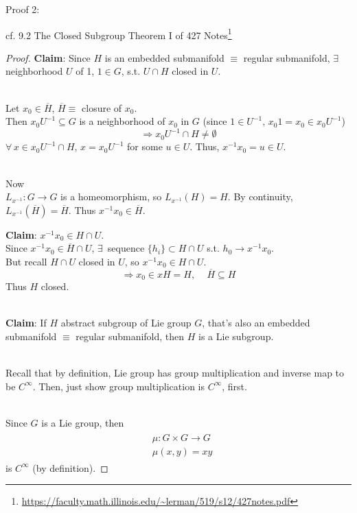 Proof 2:

cf. 9.2 The Closed Subgroup Theorem I of 427 Notes\footnote{\url{https://faculty.math.illinois.edu/~lerman/519/s12/427notes.pdf}}

\begin{proof}

	\textbf{Claim}: Since $H$ is an embedded submanifold $\equiv $ regular submanifold, $\exists \, $ neighborhood $U$ of 1, $1 \in G$, s.t. $U\cap H$ closed in $U$. 
	
	\qquad \, \\
	Let $x_0 \in \overline{H}$, $\overline{H} \equiv $ closure of $x_0$. \\
	Then $x_0U^{-1} \subseteq G$ is a neighborhood of $x_0$ in $G$ (since $1 \in U^{-1}$, $x_0 1 = x_0 \in x_0 U^{-1}$)
	\[
	\Longrightarrow x_0 U^{-1} \cap H \neq \emptyset 
	\]
	$\forall \, x \in x_0 U^{-1} \cap H$, $x= x_0 U^{-1}$ for some $u\in U$. Thus, $x^{-1} x_0 = u \in U$.
	
	\quad \\
	Now  \\
	$L_{x^{-1}} : G \to G$ is a homeomorphism, so $L_{x^{-1}}(H) = H$. By continuity, $L_{x^{-1}}(\overline{H}) = \overline{H}$. Thus $x^{-1}x_0 \in \overline{H}$. 
	
	\textbf{Claim}: $x^{-1} x_0 \in H \cap U$. \\
	Since $x^{-1}x_0 \in \overline{H} \cap U$, $\exists \, $ sequence $\lbrace h_i \rbrace \subset H \cap U$ s.t. $h_0 \to x^{-1} x_0$. \\
	But recall $H\cap U$ closed in $U$, so $x^{-1}x_0 \in H\cap U$. 
	\[
	\Longrightarrow x_0 \in xH = H , \quad \, \overline{H} \subseteq H
	\]
	Thus $H$ closed. 

	\quad \\ 	
	\textbf{Claim}: If $H$ abstract subgroup of Lie group $G$, that's also an embedded submanifold $\equiv$ regular submanifold, then $H$ is a Lie subgroup. 
	
	\quad \\ 
	Recall that by definition, Lie group has group multiplication and inverse map to be $C^{\infty}$. Then, just show group multiplication is $C^{\infty}$, first.

\quad \\	
Since $G$ is a Lie group, then
\[
\begin{gathered}
\begin{aligned}
& \mu : G \times G \to G \\
& \mu(x,y) = xy
\end{aligned}
\end{gathered}
\]	
is $C^{\infty}$ (by definition).


\end{proof}

